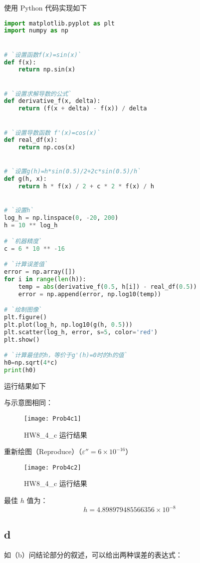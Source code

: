 \documentclass[UTF8]{ctexart}
\begin{document}
    使用 Python 代码实现如下
    \begin{lstlisting}[language=Python, breaklines = true,label={lst:lstlisting4.3}]
import matplotlib.pyplot as plt
import numpy as np


# `设置函数f(x)=sin(x)`
def f(x):
    return np.sin(x)


# `设置求解导数的公式`
def derivative_f(x, delta):
    return (f(x + delta) - f(x)) / delta


# `设置导数函数 f'(x)=cos(x)`
def real_df(x):
    return np.cos(x)


# `设置g(h)=h*sin(0.5)/2+2c*sin(0.5)/h`
def g(h, x):
    return h * f(x) / 2 + c * 2 * f(x) / h


# `设置h`
log_h = np.linspace(0, -20, 200)
h = 10 ** log_h

# `机器精度`
c = 6 * 10 ** -16

# `计算误差值`
error = np.array([])
for i in range(len(h)):
    temp = abs(derivative_f(0.5, h[i]) - real_df(0.5))
    error = np.append(error, np.log10(temp))

# `绘制图像`
plt.figure()
plt.plot(log_h, np.log10(g(h, 0.5)))
plt.scatter(log_h, error, s=5, color='red')
plt.show()

# `计算最佳的h，等价于g'(h)=0时的h的值`
h0=np.sqrt(4*c)
print(h0)
    \end{lstlisting}

    运行结果如下

    与示意图相同：
    \begin{figure}[h]
        \centering
        \texttt{[image: Prob4c1]}
        \caption{HW8\_4\_c 运行结果}\label{fig:figure4.3.1}
    \end{figure}

    \newpage
    重新绘图（Reproduce）（\(\varepsilon'' = 6 \times 10^{-16}\)）
    \begin{figure}[h]
        \centering
        \texttt{[image: Prob4c2]}
        \caption{HW8\_4\_c 运行结果}\label{fig:figure4.3.2}
    \end{figure}
    \newpage
    最佳 \(h\) 值为：
    \begin{equation*}
        h = 4.898979485566356 \times 10^{-8}
    \end{equation*}

    \newpage
    \subsection{d}\label{subsec:4.4}
    如（b）问结论部分的叙述，可以给出两种误差的表达式：
\end{document}
